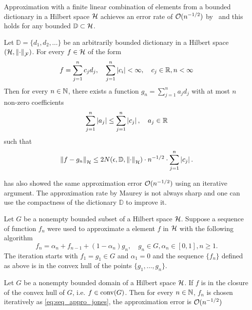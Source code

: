 Approximation with a finite linear combination of elements from a bounded
dictionary in a Hilbert space $\mathcal{H}$ achieves an error rate of
$\mathcal{O}(n^{-1/2})$ by~\cite{pisierRemarquesResultatNon1980} and this holds for
any bounded $\mathbb{D} \subset \mathcal{H}$.

\begin{theorem}
    \label{thm:maurey}
    Let $\mathbb{D} = \{d_1, d_2, \dots\}$ be an arbitrarily bounded dictionary
    in a Hilbert space $(\mathcal{H}, \left\| \cdot \right\|_{\mathcal{F}})$. For every $f \in
    \mathcal{H}$ of the form
    \begin{equation}
        f = \sum_{j=1}^n c_j d_j, \quad
        \sum_{j=1}^n \left| c_i \right| < \infty, \quad
        c_j \in \mathbb{R}, n < \infty
    \end{equation}
    Then for every $n \in \mathbb{N}$, there exists a function $g_n = \sum_{j=1}^n a_j
    d_j$ with at most $n$ non-zero coefficients
    \begin{equation}
        \sum_{j=1}^n \left| a_j \right| \leq
        \sum_{j=1}^n \left| c_j \right|, 
        \quad a_j \in \mathbb{R}
    \end{equation}
    such that
    \begin{equation}
        \left\| f - g_n \right\|_{\mathcal{H}} \leq
        2 N(\epsilon, \mathbb{D}, \left\| \cdot \right\|_{\mathcal{H}})
        \cdot n^{-1/2}
        \cdot \sum_{j=1}^n \left| c_j \right|.
    \end{equation}

\end{theorem}

\cite{jonesSimpleLemmaGreedy1992} has also showed the same approximation error
$\mathcal{O}(n^{-1/2})$ using an iterative argument. The approximation rate by Maurey
is not always sharp and one can use the compactness of the dictionary
$\mathbb{D}$ to improve it.

Let $G$ be a nonempty bounded subset of a Hilbert space $\mathcal{H}$. Suppose a
sequence of function $f_n$ were used to approximate a element $f$ in $\mathcal{H}$
with the following algorithm
\begin{equation}
    \label{eq:seq_appro_jones}
    f_n = \alpha_n + f_{n-1} + (1-\alpha_n) g_n, \quad
    g_n \in G, \alpha_n \in [0,1], n \geq 1.
\end{equation}
The iteration starts with $f_1 = g_1 \in G$ and $\alpha_1 = 0$ and the sequence
$\{f_n\}$ defined as above is in the convex hull of the points $\{g_1,\dots,
g_n\}$.

\begin{theorem}
    Let $G$ be a nonempty bounded domain of a Hilbert space $\mathcal{H}$. If $f$
    is in the closure of the convex hull of $G$, i.e. $f \in \textrm{conv}(G)$. Then for
    every $n \in \mathbb{N}$, $f_n$ is chosen iteratively as
    \eqref{eq:seq_appro_jones}, the approximation error is $\mathcal{O}(n^{-1/2})$
\end{theorem}

